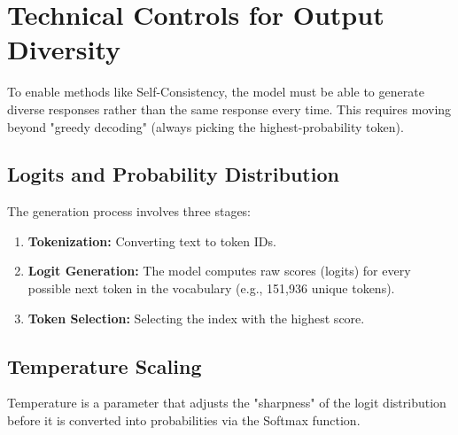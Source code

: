 \section{Technical Controls for Output Diversity}
\label{sec:technical-controls-for-output-diversity}


To enable methods like Self-Consistency, the model must be able to generate diverse responses rather than the same response every time. This requires moving beyond "greedy decoding" (always picking the highest-probability token).

\subsection{Logits and Probability Distribution}

The generation process involves three stages:

\begin{enumerate}
    \item \textbf{Tokenization:} Converting text to token IDs.
    \item \textbf{Logit Generation:} The model computes raw scores (logits) for every possible next token in the vocabulary (e.g., 151,936 unique tokens).
    \item \textbf{Token Selection:} Selecting the index with the highest score.
\end{enumerate}

\subsection{Temperature Scaling}

Temperature is a parameter that adjusts the "sharpness" of the logit distribution before it is converted into probabilities via the Softmax function.

